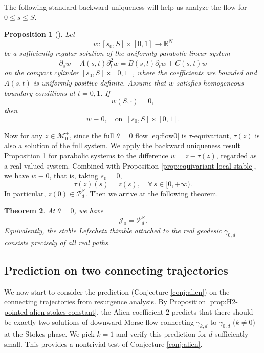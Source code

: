 \documentclass[11pt]{amsart}
\theoremstyle{plain}
\newtheorem{thm}{Theorem}[section]
\newtheorem{prop}[thm]{Proposition}
\theoremstyle{definition}
\newcommand{\R}{\mathbb{R}}
\newcommand{\PP}{\mathcal{P}}
\begin{document}
The following standard backward uniqueness will help us analyze the flow for $0\le s\le S$.

\begin{prop}[{\cite{LM1960}}]
\label{prop:backward-uniqueness-parabolic-system}
Let
\[w : [s_0,S]\times[0,1]\longrightarrow \R^N
\]
be a sufficiently regular solution of the uniformly parabolic linear system
\[\partial_s w-A(s,t)\partial_t^2 w
=B(s,t)\partial_t w+C(s,t)w
\]
on the compact cylinder $[s_0,S]\times[0,1]$, where the coefficients are bounded and $A(s,t)$ is uniformly positive definite. Assume that $w$ satisfies homogeneous boundary conditions at $t=0,1$. If
\[w(S,\cdot)=0,\]
then
\[w\equiv 0,\quad \text{on }~ [s_0,S]\times[0,1].\]
\end{prop}



Now for any $z\in \mathcal{M}_0^+$, since the full $\theta=0$ flow \eqref{eq:flow0} is $\tau$-equivariant,  $\tau(z)$ is also a solution of the full system. We apply the backward uniqueness result Proposition  \ref{prop:backward-uniqueness-parabolic-system} for parabolic systems 
to the difference $w=z-\tau(z)$, regarded as a real-valued system. Combined with Proposition \ref{prop:equivariant-local-stable}, we have $w\equiv0$, that is, taking $s_0=0$,
\[\tau(z)(s)=z(s),\quad \forall\,s\in[0,+\infty).\]
In particular, $z(0)\in\PP_d^{\R}$. Then we arrive at the following theorem.

\begin{thm}\label{thm:global-real-thimble}
At $\theta=0$, we have
\[
\mathcal{J}_0=\PP_d^{\R}.
\]
Equivalently, the stable Lefschetz thimble attached to the real geodesic
$\gamma_{0,d}$ consists precisely of all real paths. 
\end{thm}




\subsection{Prediction on two connecting trajectories}
We now start to consider the prediction (Conjecture \ref{conj:alien}) on the connecting trajectories from resurgence analysis. By Proposition \ref{prop:H2-pointed-alien-stokes-constant}, the Alien coefficient $2$ predicts that there should be exactly two solutions of downward Morse flow connecting $\gamma_{k,d}$ to $\gamma_{0,d}$ ($k\neq 0$) at the Stokes phase. We pick $k=1$ and verify this prediction for $d$ sufficiently small. This provides a nontrivial test of Conjecture \ref{conj:alien}.
\end{document}
